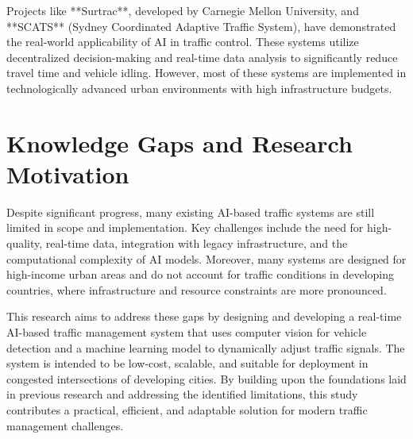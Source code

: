 Projects like **Surtrac**, developed by Carnegie Mellon University, and **SCATS** (Sydney Coordinated Adaptive Traffic System), have demonstrated the real-world applicability of AI in traffic control. These systems utilize decentralized decision-making and real-time data analysis to significantly reduce travel time and vehicle idling. However, most of these systems are implemented in technologically advanced urban environments with high infrastructure budgets.

\section{Knowledge Gaps and Research Motivation}

Despite significant progress, many existing AI-based traffic systems are still limited in scope and implementation. Key challenges include the need for high-quality, real-time data, integration with legacy infrastructure, and the computational complexity of AI models. Moreover, many systems are designed for high-income urban areas and do not account for traffic conditions in developing countries, where infrastructure and resource constraints are more pronounced.

This research aims to address these gaps by designing and developing a real-time AI-based traffic management system that uses computer vision for vehicle detection and a machine learning model to dynamically adjust traffic signals. The system is intended to be low-cost, scalable, and suitable for deployment in congested intersections of developing cities. By building upon the foundations laid in previous research and addressing the identified limitations, this study contributes a practical, efficient, and adaptable solution for modern traffic management challenges.